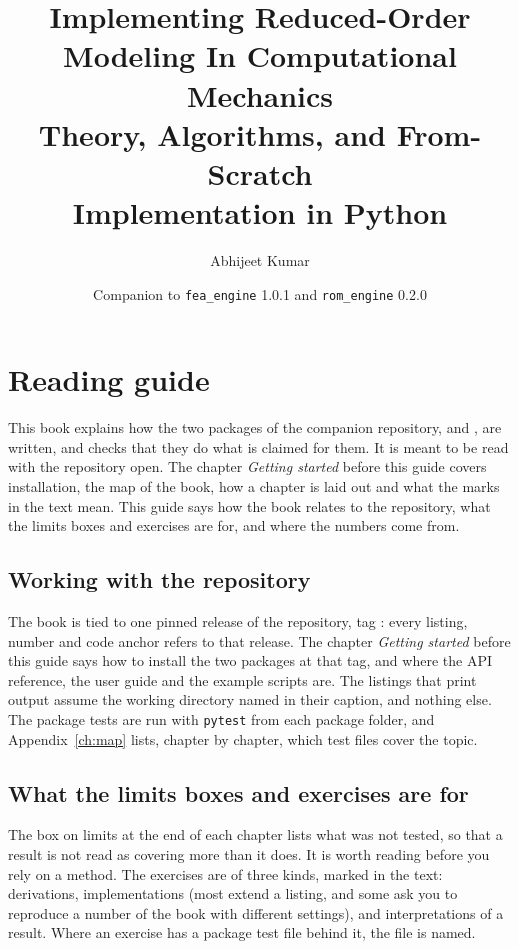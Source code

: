 \documentclass[11pt,a4paper,twoside,openany]{book}
\title{Implementing Reduced-Order Modeling In Computational Mechanics\\[1ex]{\Large Theory, Algorithms, and From-Scratch\\Implementation in Python}}
\author{Abhijeet Kumar}
\date{Companion to \texttt{fea\_engine} 1.0.1 and \texttt{rom\_engine} 0.2.0}
\begin{document}


\frontmatter
\maketitle




\chapter*{Reading guide}
This book explains how the two packages of the companion repository, \fea{} and \rom{}, are written, and checks that they do what is claimed for them. It is meant to be read with the repository open. The chapter \emph{Getting started} before this guide covers installation, the map of the book, how a chapter is laid out and what the marks in the text mean. This guide says how the book relates to the repository, what the limits boxes and exercises are for, and where the numbers come from.

\section*{Working with the repository}

The book is tied to one pinned release of the repository, tag \booktag{}: every listing, number and code anchor refers to that release. The chapter \emph{Getting started} before this guide says how to install the two packages at that tag, and where the API reference, the user guide and the example scripts are. The listings that print output assume the working directory named in their caption, and nothing else. The package tests are run with \texttt{pytest} from each package folder, and Appendix~\ref{ch:map} lists, chapter by chapter, which test files cover the topic.

\section*{What the limits boxes and exercises are for}

The box on limits at the end of each chapter lists what was not tested, so that a result is not read as covering more than it does. It is worth reading before you rely on a method. The exercises are of three kinds, marked in the text: derivations, implementations (most extend a listing, and some ask you to reproduce a number of the book with different settings), and interpretations of a result. Where an exercise has a package test file behind it, the file is named.
\end{document}
